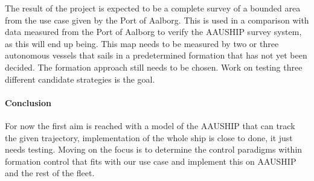 \documentclass[a4paper,12pt]{article}
\begin{document}
The result of the project is expected to be a complete
survey of a bounded area from the use case given by the Port of
Aalborg. This is used in a comparison with data measured from the Port
of Aalborg to verify the AAUSHIP survey system, as this will end up
being. This map needs to be measured by two or three autonomous
vessels that sails in a predetermined formation that has not yet been
decided. The formation approach still needs to be chosen. Work on
testing three different candidate strategies is the goal. 
 
\paragraph{Conclusion}
For now the first aim is reached with a model of the AAUSHIP that can
track the given trajectory, implementation of the whole ship is close
to done, it just needs testing. Moving on the focus is to determine
the control paradigms within formation control that fits with our
use case and implement this on AAUSHIP and the rest of the fleet.

\end{document}
